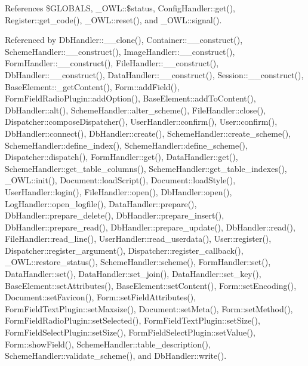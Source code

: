 References \$GLOBALS, \_\-OWL::\$status, ConfigHandler::get(), Register::get\_\-code(), \_\-OWL::reset(), and \_\-OWL::signal().



Referenced by DbHandler::\_\-\_\-clone(), Container::\_\-\_\-construct(), SchemeHandler::\_\-\_\-construct(), ImageHandler::\_\-\_\-construct(), FormHandler::\_\-\_\-construct(), FileHandler::\_\-\_\-construct(), DbHandler::\_\-\_\-construct(), DataHandler::\_\-\_\-construct(), Session::\_\-\_\-construct(), BaseElement::\_\-getContent(), Form::addField(), FormFieldRadioPlugin::addOption(), BaseElement::addToContent(), DbHandler::alt(), SchemeHandler::alter\_\-scheme(), FileHandler::close(), Dispatcher::composeDispatcher(), UserHandler::confirm(), User::confirm(), DbHandler::connect(), DbHandler::create(), SchemeHandler::create\_\-scheme(), SchemeHandler::define\_\-index(), SchemeHandler::define\_\-scheme(), Dispatcher::dispatch(), FormHandler::get(), DataHandler::get(), SchemeHandler::get\_\-table\_\-columns(), SchemeHandler::get\_\-table\_\-indexes(), \_\-OWL::init(), Document::loadScript(), Document::loadStyle(), UserHandler::login(), FileHandler::open(), DbHandler::open(), LogHandler::open\_\-logfile(), DataHandler::prepare(), DbHandler::prepare\_\-delete(), DbHandler::prepare\_\-insert(), DbHandler::prepare\_\-read(), DbHandler::prepare\_\-update(), DbHandler::read(), FileHandler::read\_\-line(), UserHandler::read\_\-userdata(), User::register(), Dispatcher::register\_\-argument(), Dispatcher::register\_\-callback(), \_\-OWL::restore\_\-status(), SchemeHandler::scheme(), FormHandler::set(), DataHandler::set(), DataHandler::set\_\-join(), DataHandler::set\_\-key(), BaseElement::setAttributes(), BaseElement::setContent(), Form::setEncoding(), Document::setFavicon(), Form::setFieldAttributes(), FormFieldTextPlugin::setMaxsize(), Document::setMeta(), Form::setMethod(), FormFieldRadioPlugin::setSelected(), FormFieldTextPlugin::setSize(), FormFieldSelectPlugin::setSize(), FormFieldSelectPlugin::setValue(), Form::showField(), SchemeHandler::table\_\-description(), SchemeHandler::validate\_\-scheme(), and DbHandler::write().

